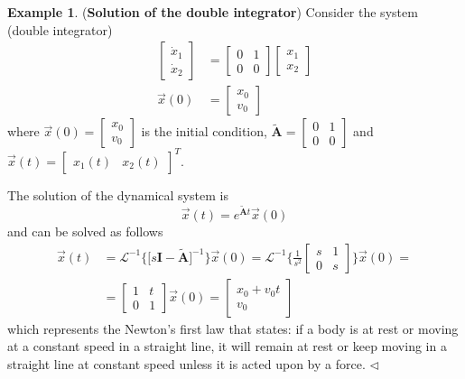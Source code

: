 \documentclass[11pt,a4paper,oneside]{book}
\numberwithin{equation}{section}
\theoremstyle{it}
\theoremstyle{definition}
\newtheorem{example}{Example}[chapter]
\begin{document}
\begin{example}(\textbf{Solution of the double integrator})
	Consider the system (double integrator)
	\begin{equation}
		\begin{aligned}
			\begin{bmatrix} \dot{x}_1 \\ \dot{x}_2 \end{bmatrix} &= \begin{bmatrix} 0 & 1 \\ 0 & 0 \end{bmatrix} \begin{bmatrix} {x}_1 \\ {x}_2 \end{bmatrix} \\[6pt]
			\vec{x}(0) &= \begin{bmatrix} x_0 \\ v_0 \end{bmatrix}
		\end{aligned}
	\end{equation}
	where $\vec{x}(0)=\begin{bmatrix} x_0 \\ v_0 \end{bmatrix}$ is the initial condition, $\tilde{\mathbf{A}} = 
	\begin{bmatrix} 0 & 1 \\ 0 & 0 \end{bmatrix}$ and $\vec{x}(t)= \begin{bmatrix} 
		x_1(t) & x_2(t) \end{bmatrix}^T$.
	
	The solution of the dynamical system is 
	\begin{equation}
		\vec{x}(t) = e^{\tilde{\mathbf{A}}t}\vec{x}(0)
	\end{equation}
	and can be solved as follows
	\begin{equation}
		\begin{aligned}
			\vec{x}(t) &= 
			\mathcal{L}^{-1}\Big\{\Big[s\mathbf{I}-\tilde{\mathbf{A}}\Big]^{-1}\Big\}\vec{x}(0)
			= \mathcal{L}^{-1}\Big\{\frac{1}{s^2}\begin{bmatrix} s & 1 \\ 0 & s 
			\end{bmatrix}\Big\}\vec{x}(0) = \\[6pt]
			&= \begin{bmatrix} 1 & t \\ 0 & 1 \end{bmatrix}\vec{x}(0) = \begin{bmatrix} x_0+v_0t \\ v_0 \end{bmatrix}
		\end{aligned}
	\end{equation}
which represents the Newton’s first law that states: if a body is at rest or moving at a constant speed in a straight line, it will remain at rest or keep moving in a straight line at constant speed unless it is acted upon by a force.
$\triangleleft$
\end{example}
\end{document}
